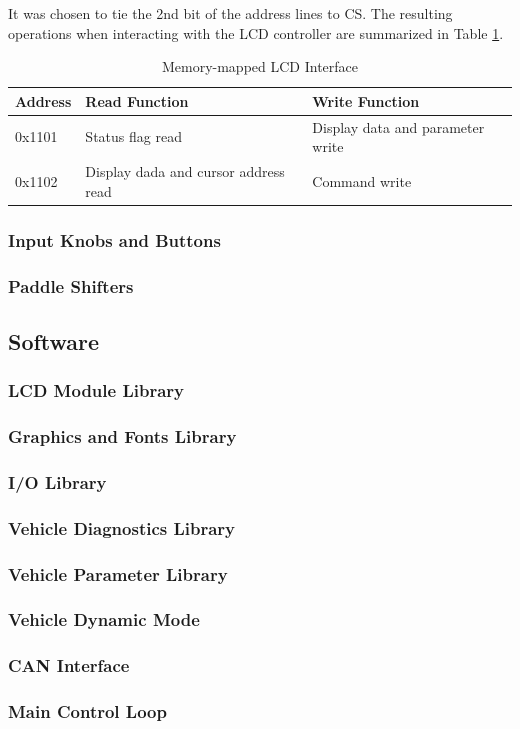 
It was chosen to tie the 2nd bit of the address lines to CS. The resulting operations when interacting with the LCD controller are summarized in Table \ref{tab:lcd_memory_map}.

\begin{table}
\caption{Memory-mapped LCD Interface}
\label{tab:lcd_memory_map}
\centering{}
\begin{tabular}{|l|l|l|}
\hline 
Address  & Read Function  & Write Function\tabularnewline
\hline
\hline 
0x1101  & Status flag read  & Display data and parameter write\tabularnewline
\hline 
0x1102  & Display dada and cursor address read  & Command write\tabularnewline
\hline
\end{tabular}
\end{table}

\subsubsection{Input Knobs and Buttons}


\subsubsection{Paddle Shifters}

\subsection{Software}


\subsubsection{LCD Module Library}


\subsubsection{Graphics and Fonts Library}


\subsubsection{I/O Library}


\subsubsection{Vehicle Diagnostics Library}


\subsubsection{Vehicle Parameter Library}


\subsubsection{Vehicle Dynamic Mode}


\subsubsection{CAN Interface}


\subsubsection{Main Control Loop}